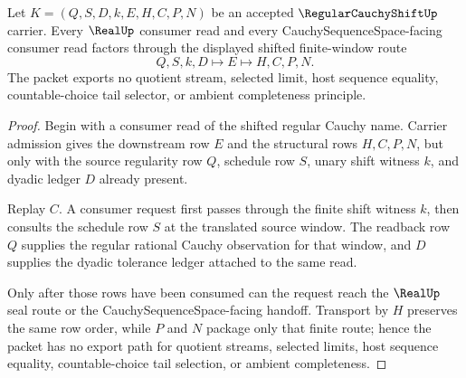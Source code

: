 \begin{theorem}
\label{thm:regular-cauchy-shift-real-seal-nonescape}
Let $K=(Q,S,D,k,E,H,C,P,N)$ be an accepted $\RegularCauchyShiftUp$ carrier. Every $\RealUp$ consumer read and every CauchySequenceSpace-facing consumer read factors through the displayed shifted finite-window route
$$
Q,S,k,D \longmapsto E \longmapsto H,C,P,N .
$$
The packet exports no quotient stream, selected limit, host sequence equality, countable-choice tail selector, or ambient completeness principle.
\end{theorem}
\begin{proof}
Begin with a consumer read of the shifted regular Cauchy name. Carrier admission gives the downstream row $E$ and the structural rows $H,C,P,N$, but only with the source regularity row $Q$, schedule row $S$, unary shift witness $k$, and dyadic ledger $D$ already present.

Replay $C$. A consumer request first passes through the finite shift witness $k$, then consults the schedule row $S$ at the translated source window. The readback row $Q$ supplies the regular rational Cauchy observation for that window, and $D$ supplies the dyadic tolerance ledger attached to the same read.

Only after those rows have been consumed can the request reach the $\RealUp$ seal route or the CauchySequenceSpace-facing handoff. Transport by $H$ preserves the same row order, while $P$ and $N$ package only that finite route; hence the packet has no export path for quotient streams, selected limits, host sequence equality, countable-choice tail selection, or ambient completeness.
\end{proof}

\begin{closurestatus}{\RegularCauchyShiftUp}
  \theoryclosure{\seedClosure}
  \formalstatus{\unformalizedV}
\end{closurestatus}
